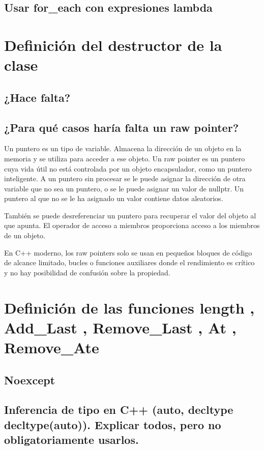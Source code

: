 \documentclass[10pt]{article}
\begin{document}
\subsection{Usar for\_each con expresiones lambda}

\newpage
\section{Definici\'on del destructor de la clase}

\subsection{¿Hace falta?}

\subsection{¿Para qué casos haría falta un raw pointer?}

Un puntero es un tipo de variable. Almacena la dirección de un objeto en la memoria y se utiliza para acceder a ese objeto. Un raw pointer es un puntero cuya vida útil no está controlada por un objeto encapsulador, como un puntero inteligente. A un puntero sin procesar se le puede asignar la dirección de otra variable que no sea un puntero, o se le puede asignar un valor de nullptr. Un puntero al que no se le ha asignado un valor contiene datos aleatorios.

También se puede desreferenciar un puntero para recuperar el valor del objeto al que apunta. El operador de acceso a miembros proporciona acceso a los miembros de un objeto.

En C++ moderno, los raw pointers solo se usan en pequeños bloques de código de alcance limitado, bucles o funciones auxiliares donde el rendimiento es crítico y no hay posibilidad de confusión sobre la propiedad.

\newpage
\section{Definici\'on de las funciones length , Add\_Last , Remove\_Last , At , Remove\_Ate}

\subsection{Noexcept}

\subsection{Inferencia de tipo en C++ (auto, decltype decltype(auto)). Explicar todos, pero no obligatoriamente usarlos.}
\end{document}
